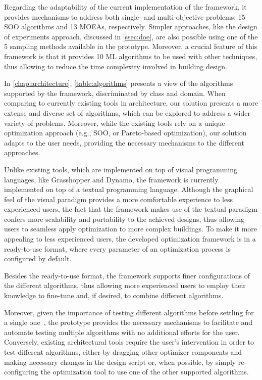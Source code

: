 Regarding the adaptability of the current implementation of the framework, it provides mechanisms to address both single- and multi-objective problems: 15 \ac{SOO} algorithms and 13 \acp{MOEA}, respectively. Simpler approaches, like the design of experiments approach, discussed in \cref{ssec:doe}, are also possible using one of the 5 sampling methods available in the prototype. Moreover, a crucial feature of this framework is that it provides 10 \ac{ML} algorithms to be used with other techniques, thus allowing to reduce the time complexity involved in building design. 

In \cref{chap:architecture}, \cref{table:algorithms} presents a view of the algorithms supported by the framework, discriminated by class and domain. When comparing to currently existing tools in architecture, our solution presents a more extense and diverse set of algorithms, which can be explored to address a wider variety of problems. Moreover, while the existing tools rely on a unique optimization approach (e.g., \ac{SOO}, or Pareto-based optimization), our solution adapts to the user needs, providing the necessary mechanisms to the different approaches.

Unlike existing tools, which are implemented on top of visual programming languages, like Grasshopper and Dynamo, the framework is currently implemented on top of a textual programming language. Although the graphical feel of the visual paradigm provides a more comfortable experience to less experienced users, the fact that the framework makes use of the textual paradigm confers more scalability and portability to the achieved designs, thus allowing users to seamless apply optimization to more complex buildings. To make it more appealing to less experienced users, the developed optimization framework is in a ready-to-use format, where every parameter of an optimization process is configured by default.  

Besides the ready-to-use format, the framework supports finer configurations of the different algorithms, thus allowing more experienced users to employ their knowledge to fine-tune and, if desired, to combine different algorithms. 

Moreover, given the importance of testing different algorithms before settling for a single one~\cite{Wortmann2016BBO}, the prototype provides the necessary mechanisms to facilitate and automate testing multiple algorithms with no additional efforts for the user. Conversely, existing architectural tools require the user's intervention in order to test different algorithms, either by dragging other optimizer components and making necessary changes in the design script or, when possible, by simply re-configuring the optimization tool to use one of the other supported algorithms. 

